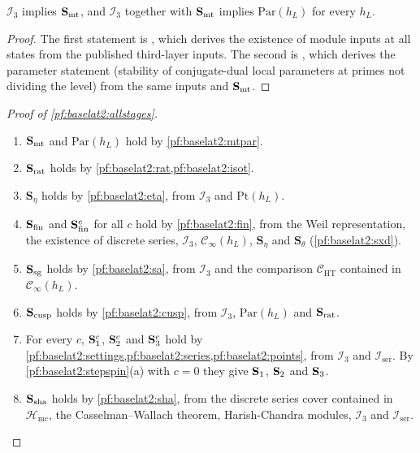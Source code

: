 \begin{lemma}\label{pf:baselat2:mtpar}
$\mathcal I_3$ implies $\mathbf{S}_{\mathrm{mt}}$, and $\mathcal I_3$ together with $\mathbf{S}_{\mathrm{mt}}$ implies $\mathrm{Par}(h_L)$ for
every $h_L$.
\end{lemma}

\begin{proof}
The first statement is , which derives the existence of
module inputs at all states from the published third-layer inputs. The second is
, which
derives the parameter statement (stability of conjugate-dual local parameters at primes not dividing the
level) from the same inputs and $\mathbf{S}_{\mathrm{mt}}$.
\end{proof}

\begin{proof}[Proof of \cref{pf:baselat2:allstages}]
\begin{enumerate}[label=(\arabic*)]
\item $\mathbf{S}_{\mathrm{mt}}$ and $\mathrm{Par}(h_L)$ hold by \cref{pf:baselat2:mtpar}.
\item $\mathbf{S}_{\mathrm{rat}}$ holds by \cref{pf:baselat2:rat,pf:baselat2:isot}.
\item $\mathbf{S}_{\eta}$ holds by \cref{pf:baselat2:eta}, from $\mathcal I_3$ and $\mathrm{Pt}(h_L)$.
\item $\mathbf{S}_{\mathrm{fin}}$ and $\mathbf{S}_{\mathrm{fin}}^{c}$ for all $c$ hold by \cref{pf:baselat2:fin}, from the Weil
  representation, the existence of discrete series, $\mathcal I_3$, $\mathcal{C}_{\infty}(h_L)$,
  $\mathbf{S}_{\eta}$ and $\mathbf{S}_{\theta}$ (\cref{pf:baselat2:sxd}).
\item $\mathbf{S}_{\mathrm{sg}}$ holds by \cref{pf:baselat2:sa}, from $\mathcal I_3$ and the comparison
  $\mathcal{C}_{\mathrm{HT}}$ contained in $\mathcal{C}_{\infty}(h_L)$.
\item $\mathbf{S}_{\mathrm{cusp}}$ holds by \cref{pf:baselat2:cusp}, from $\mathcal I_3$, $\mathrm{Par}(h_L)$
  and $\mathbf{S}_{\mathrm{rat}}$.
\item For every $c$, $\mathbf{S}_{\mathrm{1}}^{c}$, $\mathbf{S}_{\mathrm{2}}^{c}$ and $\mathbf{S}_{\mathrm{3}}^{c}$ hold by
  \cref{pf:baselat2:settings,pf:baselat2:series,pf:baselat2:points}, from $\mathcal I_3$ and $\mathcal I_{\mathrm{ser}}$.
  By \cref{pf:baselat2:stepspin}(a) with $c=0$ they give $\mathbf{S}_{\mathrm{1}}$, $\mathbf{S}_{\mathrm{2}}$ and
  $\mathbf{S}_{\mathrm{3}}$.
\item $\mathbf{S}_{\mathrm{sha}}$ holds by \cref{pf:baselat2:sha}, from the discrete series cover contained in
  $\mathcal{H}_{\mathrm{mc}}$, the Casselman--Wallach theorem, Harish-Chandra modules, $\mathcal I_3$ and
  $\mathcal I_{\mathrm{ser}}$.\qedhere
\end{enumerate}
\end{proof}

